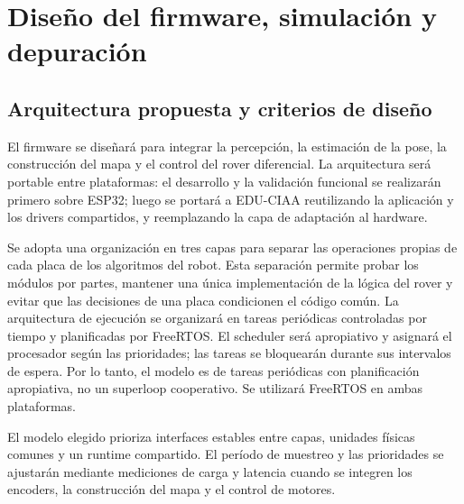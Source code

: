 
\section{Diseño del firmware, simulación y depuración}
\label{sec:diseno-firmware}

\subsection{Arquitectura propuesta y criterios de diseño}

El firmware se diseñará para integrar la percepción, la estimación de la pose,
la construcción del mapa y el control del rover diferencial. La arquitectura
será portable entre plataformas: el desarrollo y la validación funcional se
realizarán primero sobre ESP32; luego se portará a EDU-CIAA reutilizando la
aplicación y los drivers compartidos, y reemplazando la capa de adaptación al
hardware.

Se adopta una organización en tres capas para separar las operaciones propias
de cada placa de los algoritmos del robot. Esta separación permite probar los
módulos por partes, mantener una única implementación de la lógica del rover y
evitar que las decisiones de una placa condicionen el código común. La
arquitectura de ejecución se organizará en tareas periódicas controladas por
tiempo y planificadas por FreeRTOS. El scheduler será apropiativo y asignará el
procesador según las prioridades; las tareas se bloquearán durante sus
intervalos de espera. Por lo tanto, el modelo es de tareas periódicas con
planificación apropiativa, no un superloop cooperativo. Se utilizará FreeRTOS
en ambas plataformas.

\begin{center}
\end{center}

El modelo elegido prioriza interfaces estables entre capas, unidades físicas
comunes y un runtime compartido. El período de muestreo y las prioridades se
ajustarán mediante mediciones de carga y latencia cuando se integren los
encoders, la construcción del mapa y el control de motores.

